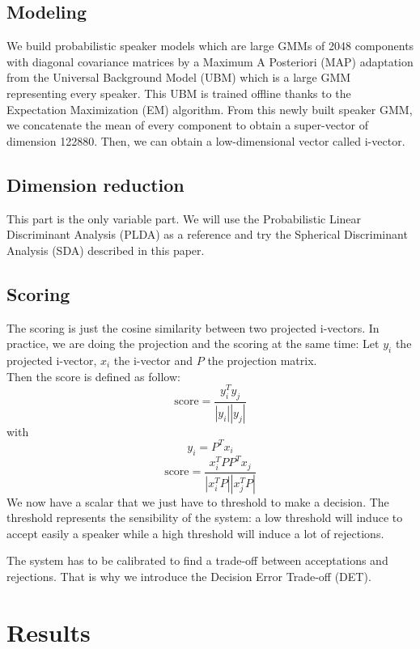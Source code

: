 \documentclass{techrep}
\begin{document}
\subsection{Modeling}

We build probabilistic speaker models which are large GMMs of 2048
components with diagonal covariance matrices by a Maximum A Posteriori
(MAP) adaptation from the Universal Background Model (UBM) which is a
large GMM representing every speaker.  This UBM is trained offline
thanks to the Expectation Maximization (EM) algorithm.  From this
newly built speaker GMM, we concatenate the mean of every component to
obtain a super-vector of dimension 122880. Then, we can obtain a
low-dimensional vector called i-vector.

\subsection{Dimension reduction}

This part is the only variable part. We will use the Probabilistic
Linear Discriminant Analysis (PLDA) as a reference and try the
Spherical Discriminant Analysis (SDA) described in this paper.

\subsection{Scoring}

The scoring is just the cosine similarity between two projected i-vectors.
In practice, we are doing the projection and the scoring at the same time:
Let $y_i$ the projected i-vector, $x_i$ the i-vector and $P$ the projection matrix.\\
Then the score is defined as follow:
$$\text{score} = \frac{y_i^Ty_j}{|y_i||y_j|}$$
with
$$y_i = P^Tx_i$$
$$\text{score} = \frac{x_i^TPP^Tx_j}{|x_i^TP||x_j^TP|}$$ We now have a
scalar that we just have to threshold to make a decision.  The
threshold represents the sensibility of the system: a low threshold
will induce to accept easily a speaker while a high threshold will
induce a lot of rejections.

The system has to be calibrated to find a trade-off between
acceptations and rejections. That is why we introduce the Decision
Error Trade-off (DET).

\section{Results}
\end{document}

